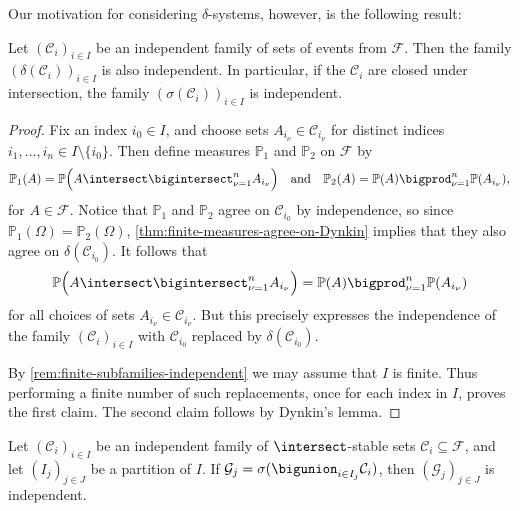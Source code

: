 \documentclass[article, a4paper, 11pt, oneside]{memoir}
\numberwithin{equation}{chapter}
\newcommand{\calF}{\mathcal{F}}
\newcommand{\calG}{\mathcal{G}}
\newcommand{\calC}{\mathcal{C}}
\renewcommand{\P}{\mathbb{P}}
\begin{document}
Our motivation for considering $\delta$-systems, however, is the following result:

\begin{proposition}
    \label{thm:Dynkin-independence}
    Let $(\calC_i)_{i \in I}$ be an independent family of sets of events from $\calF$. Then the family $(\delta(\calC_i))_{i \in I}$ is also independent. In particular, if the $\calC_i$ are closed under intersection, the family $(\sigma(\calC_i))_{i \in I}$ is independent.
\end{proposition}

\begin{proof}
    Fix an index $i_0 \in I$, and choose sets $A_{i_\nu} \in \calC_{i_\nu}$ for distinct indices $i_1, \ldots, i_n \in I \setminus \{i_0\}$. Then define measures $\P_1$ and $\P_2$ on $\calF$ by
    \begin{equation*}
        \P_1(A)
            = \P \Bigl( A \intersect \bigintersect_{\nu = 1}^n A_{i_\nu} \Bigr)
        \quad \text{and} \quad
        \P_2(A)
            = \P(A) \bigprod_{\nu = 1}^n \P(A_{i_\nu}),
    \end{equation*}
    for $A \in \calF$. Notice that $\P_1$ and $\P_2$ agree on $\calC_{i_0}$ by independence, so since $\P_1(\Omega) = \P_2(\Omega)$, \cref{thm:finite-measures-agree-on-Dynkin} implies that they also agree on $\delta(\calC_{i_0})$. It follows that
    \begin{equation*}
        \P \Bigl( A \intersect \bigintersect_{\nu = 1}^n A_{i_\nu} \Bigr)
            = \P(A) \bigprod_{\nu = 1}^n \P(A_{i_\nu})
    \end{equation*}
    for all choices of sets $A_{i_\nu} \in \calC_{i_\nu}$. But this precisely expresses the independence of the family $(\calC_i)_{i \in I}$ with $\calC_{i_0}$ replaced by $\delta(\calC_{i_0})$.

    By \cref{rem:finite-subfamilies-independent} we may assume that $I$ is finite. Thus performing a finite number of such replacements, once for each index in $I$, proves the first claim. The second claim follows by Dynkin's lemma.
\end{proof}


\begin{proposition}
    \label{prop:combining-sigma-algebras}
    Let $(\calC_i)_{i \in I}$ be an independent family of $\intersect$-stable sets $\calC_i \subseteq \calF$, and let $(I_j)_{j \in J}$ be a partition of $I$. If $\calG_j = \sigma( \bigunion_{i \in I_j} \calC_i)$, then $(\calG_j)_{j \in J}$ is independent.
\end{proposition}
\end{document}

